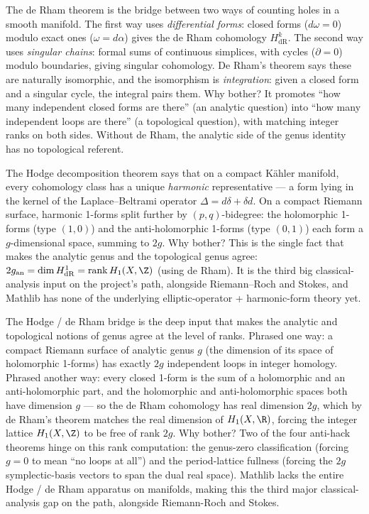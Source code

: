 \begin{layman}
The de Rham theorem is the bridge between two ways of counting
holes in a smooth manifold. The first way uses
\emph{differential forms}: closed forms (\(d\omega = 0\)) modulo
exact ones (\(\omega = d\alpha\)) gives the de Rham cohomology
\(H^k_{\mathrm{dR}}\). The second way uses \emph{singular chains}:
formal sums of continuous simplices, with cycles (\(\partial = 0\))
modulo boundaries, giving singular cohomology. De Rham's theorem
says these are naturally isomorphic, and the isomorphism is
\emph{integration}: given a closed form and a singular cycle, the
integral pairs them. Why bother? It promotes ``how many independent
closed forms are there'' (an analytic question) into ``how many
independent loops are there'' (a topological question), with
matching integer ranks on both sides. Without de Rham, the
analytic side of the genus identity has no topological referent.
\end{layman}



\begin{layman}
The Hodge decomposition theorem says that on a compact K\"ahler
manifold, every cohomology class has a unique \emph{harmonic}
representative --- a form lying in the kernel of the
Laplace--Beltrami operator \(\Delta = d\delta + \delta d\). On a
compact Riemann surface, harmonic 1-forms split further by
\((p,q)\)-bidegree: the holomorphic 1-forms (type \((1,0)\)) and
the anti-holomorphic 1-forms (type \((0,1)\)) each form a
\(g\)-dimensional space, summing to \(2g\). Why bother? This is
the single fact that makes the analytic genus and the topological
genus agree: \(2g_{\mathrm{an}} = \dim H^1_{\mathrm{dR}} =
\mathrm{rank}\, H_1(X,\Z)\) (using de Rham). It is the third
big classical-analysis input on the project's path, alongside
Riemann--Roch and Stokes, and Mathlib has none of the underlying
elliptic-operator + harmonic-form theory yet.
\end{layman}



\begin{layman}
The Hodge / de Rham bridge is the deep input that makes the
analytic and topological notions of genus agree at the level of
ranks. Phrased one way: a compact Riemann surface of analytic
genus \(g\) (the dimension of its space of holomorphic 1-forms) has
exactly \(2g\) independent loops in integer homology. Phrased
another way: every closed 1-form is the sum of a holomorphic and
an anti-holomorphic part, and the holomorphic and anti-holomorphic
spaces both have dimension \(g\) --- so the de Rham cohomology has
real dimension \(2g\), which by de Rham's theorem matches the
real dimension of \(H_1(X,\R)\), forcing the integer lattice
\(H_1(X,\Z)\) to be free of rank \(2g\). Why bother? Two of the
four anti-hack theorems hinge on this rank computation: the
genus-zero classification (forcing \(g=0\) to mean ``no loops at
all'') and the period-lattice fullness (forcing the
\(2g\) symplectic-basis vectors to span the dual real space).
Mathlib lacks the entire Hodge / de Rham apparatus on manifolds,
making this the third major classical-analysis gap on the path,
alongside Riemann-Roch and Stokes.
\end{layman}


